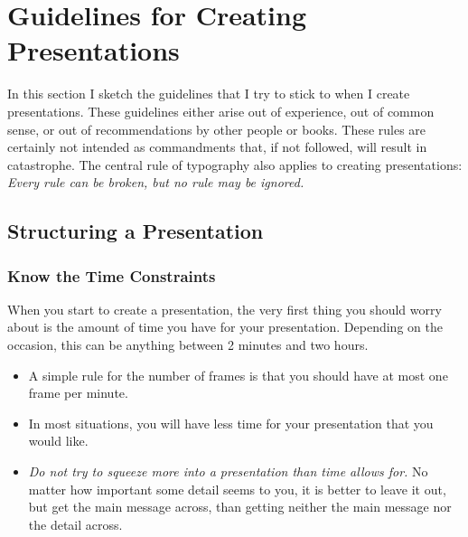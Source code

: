 %
%
%


\section{Guidelines for Creating Presentations}


\label{section-guidelines}

In this section I sketch the guidelines that I try to stick to when I
create presentations. These guidelines either arise out of experience,
out of common sense, or out of recommendations by other people or
books. These rules are certainly not intended as commandments that, if
not followed, will result in catastrophe. The central rule of
typography also applies to creating presentations: \emph{Every rule
  can be broken, but no rule may be ignored.} 




\subsection{Structuring a Presentation}

\label{section-structure-guidelines}



\subsubsection{Know the Time Constraints}

When you start to create a presentation, the very first thing you
should worry about is the amount of time you have for your
presentation. Depending on the occasion, this can
be anything between 2 minutes and two hours.

\begin{itemize}
\item
  A simple rule for the number of frames is that you should have at
  most one frame per minute.
\item
  In most situations, you will have less time for your presentation
  that you would like.
\item
  \emph{Do not try to squeeze more into a presentation than time
  allows for.} No matter how important some detail seems to you, it is
  better to leave it out, but get the main message across, than
  getting neither the main message nor the detail across.
\end{itemize}

